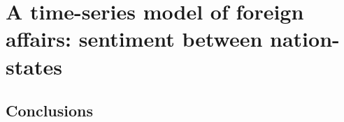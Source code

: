 \chapter{A time-series model of foreign affairs: sentiment between nation-states}

\label{chapter:foreign_relations}







\section*{Conclusions}
